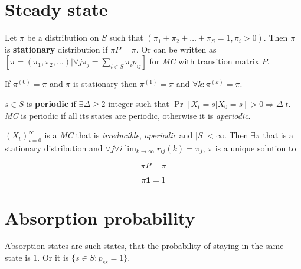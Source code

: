 \section{Steady state}

\begin{defn}
	Let $\pi$ be a distribution on $S$ such that $\left( \pi_{1} + \pi_{2} + \dots + \pi_{S} = 1, \pi_{i} > 0\right)$. Then $\pi$ is \textbf{stationary} distribution if $\pi P = \pi$. Or can be written as $\left[ \pi = (\pi_{1}, \pi_{2}, \dots) \vert \forall j \pi_{j} = \sum_{i \in S} \pi_{i} p_{ij}\right]$ for \textit{MC} with transition matrix $P$.
\end{defn}

\begin{observ}
	If $\pi^{(0)} = \pi$ and $\pi$ is stationary then $\pi^{(1)} = \pi$ and $\forall k : \pi^{(k)} = \pi$.
\end{observ}

\begin{defn}
	$s \in S$ is \textbf{periodic} if $\exists \Delta \geq 2$ integer such that $\Pr[X_{t} = s \vert X_{0} = s] > 0 \Rightarrow \Delta \vert t$. \textit{MC} is periodic if all its states are periodic, otherwise it is \textit{aperiodic}.
\end{defn}

\begin{thm}
	$(X_{t})_{t = 0}^{\infty}$ is a \textit{MC} that is \textit{irreducible}, \textit{aperiodic} and $|S| < \infty$. Then $\exists \pi$ that is a stationary distribution and $\forall j \forall i \lim_{k\to\infty}r_{ij}(k) = \pi_{j}$, $\pi$ is a unique solution to
	
	$$
	\pi P = \pi
	$$
	
	$$
	\pi \mathbf{1} = 1
	$$
\end{thm}

\section{Absorption probability}

\begin{defn}
	Absorption states are such states, that the probability of staying in the same state is $1$. Or it is $\{s \in S : p_{ss} = 1\}$.
\end{defn}




